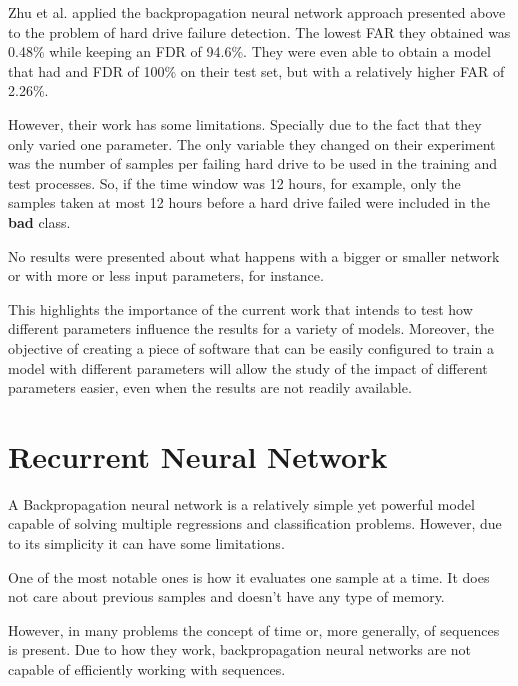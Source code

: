 Zhu et al. \cite{Zhu13} applied the backpropagation neural network approach presented above to the problem of hard drive failure detection.
The lowest FAR they obtained was 0.48\% while keeping an FDR of 94.6\%.
They were even able to obtain a model that had and FDR of 100\% on their test set, but with a relatively higher FAR of 2.26\%.

However, their work has some limitations.
Specially due to the fact that they only varied one parameter.
The only variable they changed on their experiment was the number of samples per failing hard drive to be used in the training and test processes.
So, if the time window was 12 hours, for example, only the samples taken at most 12 hours before a hard drive failed were included in the \textbf{bad} class.

No results were presented about what happens with a bigger or smaller network or with more or less input parameters, for instance.

This highlights the importance of the current work that intends to test how different parameters influence the results for a variety of models.
Moreover, the objective of creating a piece of software that can be easily configured to train a model with different parameters will allow the study of the impact of different parameters easier, even when the results are not readily available. 



\section{Recurrent Neural Network}\label{sec:RecurrentNeuralNetwork}

A Backpropagation neural network is a relatively simple yet powerful model capable of solving multiple regressions and classification problems.
However, due to its simplicity it can have some limitations.

One of the most notable ones is how it evaluates one sample at a time.
It does not care about previous samples and doesn't have any type of memory.

However, in many problems the concept of time or, more generally, of sequences is present.
Due to how they work, backpropagation neural networks are not capable of efficiently working with sequences.

